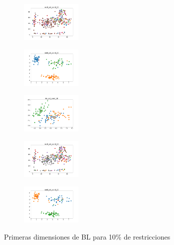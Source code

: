 \begin{figure}[H]
\begin{subfigure}
    \end{subfigure}
    \hfill
    \begin{subfigure}
        \centering
        \includegraphics[width=0.32\textwidth]{img/bl/ecoli_set_const_10_49258669_clust.png}
    \end{subfigure}
    \hfill
    \begin{subfigure}
        \centering
        \includegraphics[width=0.32\textwidth]{img/bl/rand_set_const_10_49258669_clust.png}
    \end{subfigure}
    \hfill
    \begin{subfigure}
        \centering
        \includegraphics[width=0.32\textwidth]{img/bl/iris_set_const_10_3773969821_clust.png}
    \end{subfigure}
    \hfill
    \begin{subfigure}
        \centering
        \includegraphics[width=0.32\textwidth]{img/bl/ecoli_set_const_10_3773969821_clust.png}
    \end{subfigure}
    \hfill
    \begin{subfigure}
        \centering
        \includegraphics[width=0.32\textwidth]{img/bl/rand_set_const_10_3773969821_clust.png}
    \end{subfigure}
    \caption{Primeras dimensiones de BL para 10\% de restricciones}
\end{figure}


